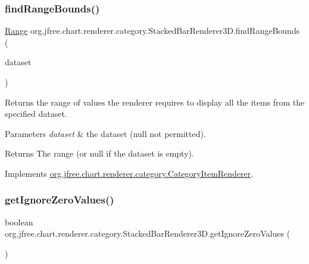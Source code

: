 \subsubsection{\texorpdfstring{find\+Range\+Bounds()}{findRangeBounds()}}
{\footnotesize\ttfamily \mbox{\hyperlink{classorg_1_1jfree_1_1data_1_1_range}{Range}} org.\+jfree.\+chart.\+renderer.\+category.\+Stacked\+Bar\+Renderer3\+D.\+find\+Range\+Bounds (\begin{DoxyParamCaption}\item[{\mbox{\hyperlink{interfaceorg_1_1jfree_1_1data_1_1category_1_1_category_dataset}{Category\+Dataset}}}]{dataset }\end{DoxyParamCaption})}

Returns the range of values the renderer requires to display all the items from the specified dataset.


\begin{DoxyParams}{Parameters}
{\em dataset} & the dataset ({\ttfamily null} not permitted).\\
\hline
\end{DoxyParams}
\begin{DoxyReturn}{Returns}
The range (or {\ttfamily null} if the dataset is empty). 
\end{DoxyReturn}


Implements \mbox{\hyperlink{interfaceorg_1_1jfree_1_1chart_1_1renderer_1_1category_1_1_category_item_renderer_aa7294c25a26ffd1725d7920a6041a785}{org.\+jfree.\+chart.\+renderer.\+category.\+Category\+Item\+Renderer}}.

\mbox{\label{classorg_1_1jfree_1_1chart_1_1renderer_1_1category_1_1_stacked_bar_renderer3_d_a6f15c826b9c0477fce153c93892c590a}} 
\subsubsection{\texorpdfstring{get\+Ignore\+Zero\+Values()}{getIgnoreZeroValues()}}
{\footnotesize\ttfamily boolean org.\+jfree.\+chart.\+renderer.\+category.\+Stacked\+Bar\+Renderer3\+D.\+get\+Ignore\+Zero\+Values (\begin{DoxyParamCaption}{ }\end{DoxyParamCaption})}

